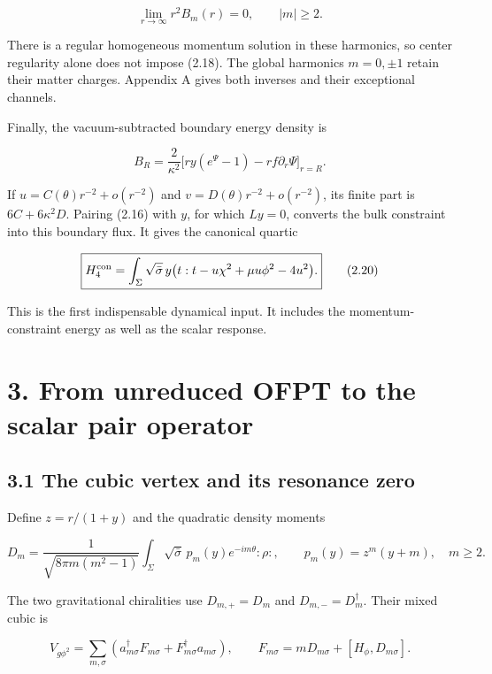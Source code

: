 \[
\lim_{r\to\infty}r^2B_m(r)=0,\qquad |m|\ge2 .
\tag{2.18}
\]

There is a regular homogeneous momentum solution in these harmonics, so center regularity alone does not impose (2.18). The global harmonics \(m=0,\pm1\) retain their matter charges. Appendix A gives both inverses and their exceptional channels.

Finally, the vacuum-subtracted boundary energy density is

\[
B_R=\frac2{\kappa^2}
\bigl[ry(e^\Psi-1)-rf\partial_r\Psi\bigr]_{r=R}.
\tag{2.19}
\]

If \(u=C(\theta)r^{-2}+o(r^{-2})\) and \(v=D(\theta)r^{-2}+o(r^{-2})\), its finite part is \(6C+6\kappa^2D\). Pairing (2.16) with \(y\), for which \(Ly=0\), converts the bulk constraint into this boundary flux. It gives the canonical quartic

\[
\boxed{
H_4^{\rm con}
=\int_\Sigma\sqrt{\bar\sigma}\,y
\bigl(t:t-u\chi^2+\mu u\phi^2-4u^2\bigr).
}
\tag{2.20}
\]

This is the first indispensable dynamical input. It includes the momentum-constraint energy as well as the scalar response.

\clearpage
\hypertarget{from-unreduced-ofpt-to-the-scalar-pair-operator}{%
\section{3. From unreduced OFPT to the scalar pair operator}\label{from-unreduced-ofpt-to-the-scalar-pair-operator}}

\hypertarget{the-cubic-vertex-and-its-resonance-zero}{%
\subsection{3.1 The cubic vertex and its resonance zero}\label{the-cubic-vertex-and-its-resonance-zero}}

Define \(z=r/(1+y)\) and the quadratic density moments

\[
D_m=\frac1{\sqrt{8\pi m(m^2-1)}}
\int_\Sigma\sqrt{\bar\sigma}\,
p_m(y)e^{-im\theta}:\rho:,
\qquad p_m(y)=z^m(y+m),\quad m\ge2.
\tag{3.1}
\]

The two gravitational chiralities use \(D_{m,+}=D_m\) and \(D_{m,-}=D_m^\dagger\). Their mixed cubic is

\[
V_{g\phi^2}
=\sum_{m,\sigma}(a^\dagger_{m\sigma}F_{m\sigma}
+F^\dagger_{m\sigma}a_{m\sigma}),\qquad
F_{m\sigma}=mD_{m\sigma}+[H_\phi,D_{m\sigma}].
\tag{3.2}
\]

